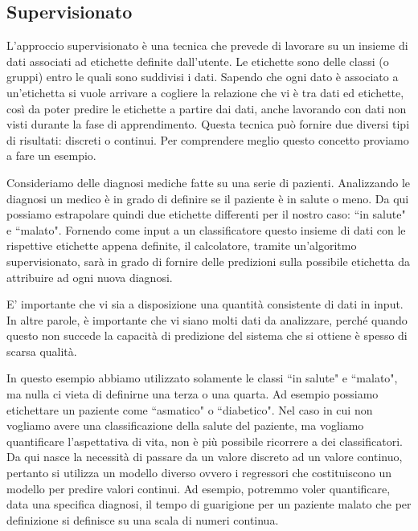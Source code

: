 \documentclass[12pt,italian]{report}
\begin{document}
\subsection{Supervisionato}

L'approccio supervisionato è una tecnica che prevede di lavorare su un insieme di dati associati ad etichette definite dall'utente. Le etichette sono delle classi (o gruppi) entro le quali sono suddivisi i dati. Sapendo che ogni dato è associato a un'etichetta si vuole arrivare a cogliere la relazione che vi è tra dati ed etichette, così da poter predire le etichette a partire dai dati, anche lavorando con dati non visti durante la fase di apprendimento.
Questa tecnica può fornire due diversi tipi di risultati: discreti o continui. Per comprendere meglio questo concetto proviamo a fare un esempio.

Consideriamo delle diagnosi mediche fatte su una serie di pazienti. Analizzando le diagnosi un medico è in grado di definire se il paziente è in salute o meno. Da qui possiamo estrapolare quindi due etichette differenti per il nostro caso: ``in salute" e ``malato". Fornendo come input a un classificatore questo insieme di dati con le rispettive etichette appena definite, il calcolatore, tramite un'algoritmo supervisionato, sarà in grado di fornire delle predizioni sulla possibile etichetta da attribuire ad ogni nuova diagnosi.

E' importante che vi sia a disposizione una quantità consistente di dati in input. In altre parole, è importante che vi siano molti dati da analizzare, perché quando questo non succede la capacità di predizione del sistema che si ottiene è spesso di scarsa qualità.

In questo esempio abbiamo utilizzato solamente le classi ``in salute" e ``malato", ma nulla ci vieta di definirne una terza o una quarta. Ad esempio possiamo etichettare un paziente come ``asmatico" o ``diabetico".
Nel caso in cui non vogliamo avere una classificazione della salute del paziente, ma vogliamo quantificare l'aspettativa di vita, non è più possibile ricorrere a dei classificatori. Da qui nasce la necessità di passare da un valore discreto ad un valore continuo, pertanto si utilizza un modello diverso ovvero i regressori che costituiscono un modello per predire valori continui. Ad esempio, potremmo voler quantificare, data una specifica diagnosi, il tempo di guarigione per un paziente malato che per definizione si definisce su una scala di numeri continua.
\end{document}
